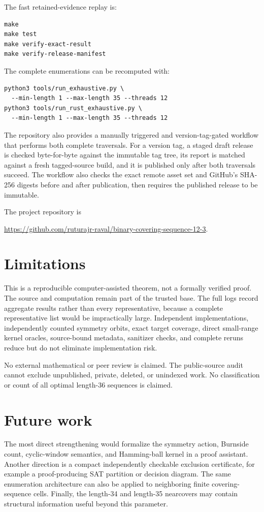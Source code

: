 \documentclass[11pt]{article}
\begin{document}
The fast retained-evidence replay is:
\begin{verbatim}
make
make test
make verify-exact-result
make verify-release-manifest
\end{verbatim}
The complete enumerations can be recomputed with:
\begin{verbatim}
python3 tools/run_exhaustive.py \
  --min-length 1 --max-length 35 --threads 12
python3 tools/run_rust_exhaustive.py \
  --min-length 1 --max-length 35 --threads 12
\end{verbatim}
The repository also provides a manually triggered and version-tag-gated
workflow that performs both complete traversals. For a version tag, a staged
draft release is checked byte-for-byte against the immutable tag tree, its
report is matched against a fresh tagged-source build, and it is published
only after both traversals succeed. The workflow also checks the exact remote
asset set and GitHub's SHA-256 digests before and after publication, then
requires the published release to be immutable.

The project repository is
\begin{center}
\url{https://github.com/ruturajr-raval/binary-covering-sequence-12-3}.
\end{center}

\section{Limitations}

This is a reproducible computer-assisted theorem, not a formally verified
proof. The source and computation remain part of the trusted base. The full
logs record aggregate results rather than every representative, because a
complete representative list would be impractically large. Independent
implementations, independently counted symmetry orbits, exact target
coverage, direct small-range kernel oracles, source-bound metadata, sanitizer
checks, and complete reruns reduce but do not eliminate implementation risk.

No external mathematical or peer review is claimed. The public-source audit
cannot exclude unpublished, private, deleted, or unindexed work. No
classification or count of all optimal length-36 sequences is claimed.

\section{Future work}

The most direct strengthening would formalize the symmetry action, Burnside
count, cyclic-window semantics, and Hamming-ball kernel in a proof assistant.
Another direction is a compact independently checkable exclusion certificate,
for example a proof-producing SAT partition or decision diagram. The same
enumeration architecture can also be applied to neighboring finite
covering-sequence cells. Finally, the length-34 and length-35 nearcovers may
contain structural information useful beyond this parameter.
\end{document}
